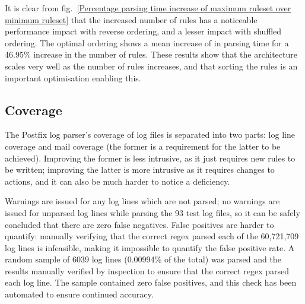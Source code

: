 \documentclass[draft]{svmult}
\newcommand{\refwithlabel}[2]{%
    #1~\vref{#2}%
}
\newcommand{\graphref}[1]{%
    \refwithlabel{fig.}{#1}%
}
\newcommand{\numberOFlogFILES}[0]{%
    93%
}
\newcommand{\numberOFrulesMAXIMUMpercentage}[0]{%
    46.95\%%
}
\newcommand{\numberOFlogLINES}[0]{%
    60,721,709%
}
\begin{document}
It is clear from \graphref{Percentage parsing time increase of maximum
ruleset over minimum ruleset} that the increased number of rules has a
noticeable performance impact with reverse ordering, and a lesser impact
with shuffled ordering.  The optimal ordering shows a mean increase of
 in parsing time for a
\numberOFrulesMAXIMUMpercentage{} increase in the number of rules.  These
results show that the architecture scales very well as the number of rules
increases, and that sorting the rules is an important optimisation enabling
this.

\subsection{Coverage}

\label{coverage}

The Postfix log parser's coverage of log files is separated into two parts:
log line coverage and mail coverage (the former is a requirement for the
latter to be achieved).  Improving the former is less intrusive, as it just
requires new rules to be written; improving the latter is more intrusive as
it requires changes to actions, and it can also be much harder to notice a
deficiency.

Warnings are issued for any log lines which are not parsed; no warnings are
issued for unparsed log lines while parsing the \numberOFlogFILES{} test
log files, so it can be safely concluded that there are zero false
negatives.  False positives are harder to quantify: manually verifying that
the correct regex parsed each of the \numberOFlogLINES{} log lines is
infeasible, making it impossible to quantify the false positive rate.  A
random sample of 6039 log lines (0.00994\% of the total) was parsed and the
results manually verified by inspection to ensure that the correct regex
parsed each log line.  The sample contained zero false positives, and this
check has been automated to ensure continued accuracy.
\end{document}
